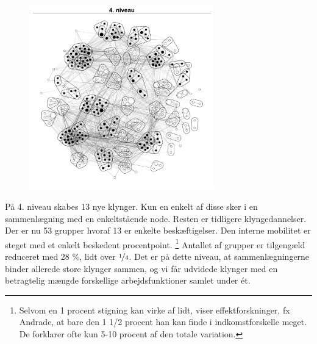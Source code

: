 \begin{figure}
  \vspace{-20pt}
  \begin{center}
   \caption{}
   \label{fig_delanalyse1_kort_seg_proces4}
    \includegraphics[width=8cm]{fig/netvaerkskort/kort_seg_proces4.pdf}
  \end{center}
  \label{fig_delanalyse1_kort_seg_proces4}
  \vspace{-20pt}
\end{figure}

På 4. niveau skabes 13 nye klynger. Kun en enkelt af disse sker i en sammenlægning med en enkeltstående node. Resten er tidligere klyngedannelser. 
Der er nu 53 grupper hvoraf 13 er enkelte beskæftigelser. Den interne mobilitet er steget med et enkelt beskedent procentpoint.
%
\footnote{Selvom en 1 procent stigning kan virke af lidt, viser effektforskninger, fx Andrade, at bare den 1 1/2 procent han kan finde i indkomstforskelle meget. De forklarer ofte kun 5-10 procent af den totale variation.}%
%
Antallet af grupper er tilgengæld reduceret med 28 \%, lidt over $\nicefrac{1}{4}$. Det er på dette niveau, at sammenlægningerne binder allerede store klynger sammen, og vi får udvidede klynger med en betragtelig mængde forskellige arbejdsfunktioner samlet under ét.

